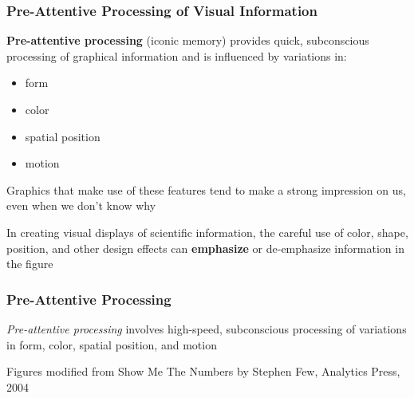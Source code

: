 \documentclass[10pt]{beamer}
\newcommand{\bi}{\begin{itemize}}
\newcommand{\ei}{\end{itemize}}
\begin{document}
\begin{frame}
\frametitle{Pre-Attentive Processing of Visual Information}

\bi 
{\small
\item {\bf \color{blue} Pre-attentive processing} (iconic memory) provides
  quick, subconscious processing of graphical information and is influenced by variations in:
  \bi
  \item form
  \item color
  \item spatial position
  \item motion
  \ei

\vspace{2ex}
\item Graphics that make use of these features tend to make a strong
  impression on us, even when we don't know why\\

\vspace{2ex}
\item In creating visual displays of scientific information, the careful use
  of color, shape, position, and other design effects can {\bf \color{red}
  emphasize} or {\color{yellow} de-emphasize} information in the figure\\

}
\ei

\end{frame}




\begin{frame}
\frametitle{Pre-Attentive Processing}

{\footnotesize {\em \color{blue} Pre-attentive processing} involves high-speed,
subconscious processing of variations in form, color, spatial position, and
motion\\}

\begin{center}
\end{center}
{\scriptsize Figures modified from {\color{blue} Show Me The Numbers} by Stephen Few, Analytics Press, 2004\\ }
\end{frame}
\end{document}
